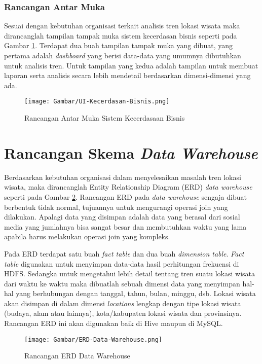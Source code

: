 \subsubsection{Rancangan Antar Muka}
Sesuai dengan kebutuhan organisasi terkait analisis tren lokasi wisata maka dirancanglah tampilan tampak muka sistem kecerdasan bisnis seperti pada Gambar \ref{fig:bi_ui}. Terdapat dua buah tampilan tampak muka yang dibuat, yang pertama adalah \textit{dashboard} yang berisi data-data yang umumnya dibutuhkan untuk analisis tren. Untuk tampilan yang kedua adalah tampilan untuk membuat laporan serta analisis secara lebih mendetail berdasarkan dimensi-dimensi yang ada. 

\begin{figure}[H]
	\centering
	\texttt{[image: Gambar/UI-Kecerdasan-Bisnis.png]}
	\caption[Rancangan Antar Muka Sistem Kecerdasaan Bisnis]{Rancangan Antar Muka Sistem Kecerdasaan Bisnis} 
	\label{fig:bi_ui}
\end{figure}

\section{Rancangan Skema \textit{Data Warehouse}}
Berdasarkan kebutuhan organisasi dalam menyelesaikan masalah tren lokasi wisata, maka dirancanglah Entity Relationship Diagram (ERD) \textit{data warehouse} seperti pada Gambar \ref{fig:erd_data_warehouse}. Rancangan ERD pada \textit{data warehouse} sengaja dibuat berbentuk tidak normal, tujuannya untuk mengurangi operasi join yang dilakukan. Apalagi data yang disimpan adalah data yang berasal dari sosial media yang jumlahnya bisa sangat besar dan membutuhkan waktu yang lama apabila harus melakukan operasi join yang kompleks.

Pada ERD terdapat satu buah \textit{fact table} dan dua buah \textit{dimension table}. \textit{Fact table} digunakan untuk menyimpan data-data hasil perhitungan frekuensi di HDFS. Sedangka untuk mengetahui lebih detail tentang tren suatu lokasi wisata dari waktu ke waktu maka dibuatlah sebuah dimensi data yang menyimpan hal-hal yang berhubungan dengan tanggal, tahun, bulan, minggu, dsb. Lokasi wisata akan disimpan di dalam dimensi \textit{locations} lengkap dengan tipe lokasi wisata (budaya, alam atau lainnya), kota/kabupaten lokasi wisata dan provinsinya. Rancangan ERD ini akan digunakan baik di Hive maupun di MySQL.

\begin{figure}[H]
	\centering
	\texttt{[image: Gambar/ERD-Data-Warehouse.png]}
	\caption[Rancangan ERD Data Warehouse]{Rancangan ERD Data Warehouse} 
	\label{fig:erd_data_warehouse}
\end{figure}
